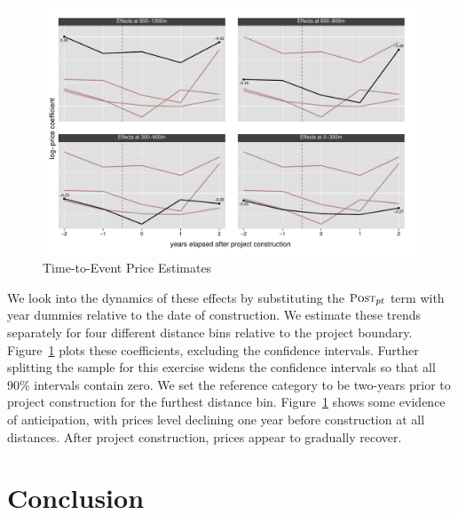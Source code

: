 \documentclass[12pt]{article}
\begin{document}
\begin{figure}[t!]
\caption{Time-to-Event Price Estimates}\label{figure:timeplot}
\centering
\includegraphics[width=0.99\textwidth,trim={0cm 0cm 0cm 0cm},clip=true]{figures/DDDplot_pertime_alt_unspaghetti}
\vspace{-2mm}
\end{figure}

We look into the dynamics of these effects by substituting the $\textsc{\small Post}_{pt}$ term with year dummies relative to the date of construction. We estimate these trends separately for four different distance bins relative to the project boundary.  Figure~\ref{figure:timeplot} plots these coefficients, excluding the confidence intervals.  Further splitting the sample for this exercise widens the confidence intervals so that all 90\% intervals contain zero.  We set the reference category to be two-years prior to project construction for the furthest distance bin. Figure~\ref{figure:timeplot} shows some evidence of anticipation, with prices level declining one year before construction at all distances. After project construction, prices appear to gradually recover. %








\section{Conclusion}\label{section:discussion}
\end{document}

